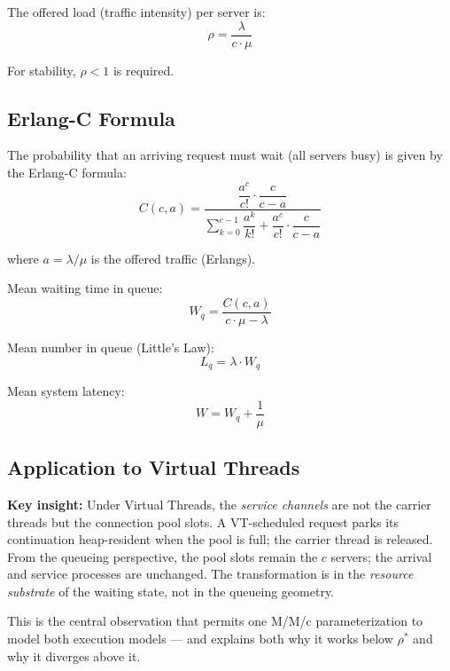 \documentclass[10pt]{article}
\begin{document}
The offered load (traffic intensity) per server is:
\begin{equation}
\rho = \frac{\lambda}{c \cdot \mu}
\label{eq:rho}
\end{equation}

For stability, $\rho < 1$ is required.

\subsection{Erlang-C Formula}
\label{sec:erlangc}

The probability that an arriving request must wait (all servers busy) is given by the Erlang-C formula:
\begin{equation}
C(c,a) = \frac{\dfrac{a^c}{c!}\cdot\dfrac{c}{c-a}}{\displaystyle\sum_{k=0}^{c-1}\dfrac{a^k}{k!} + \dfrac{a^c}{c!}\cdot\dfrac{c}{c-a}}
\label{eq:erlangc}
\end{equation}

where $a = \lambda/\mu$ is the offered traffic (Erlangs).

Mean waiting time in queue:
\begin{equation}
W_q = \frac{C(c,a)}{c\cdot\mu - \lambda}
\label{eq:wq}
\end{equation}

Mean number in queue (Little's Law):
\begin{equation}
L_q = \lambda \cdot W_q
\label{eq:lq}
\end{equation}

Mean system latency:
\begin{equation}
W = W_q + \frac{1}{\mu}
\label{eq:w}
\end{equation}

\subsection{Application to Virtual Threads}

\textbf{Key insight:} Under Virtual Threads, the \emph{service channels} are not the carrier threads but the connection pool slots. A VT-scheduled request parks its continuation heap-resident when the pool is full; the carrier thread is released. From the queueing perspective, the pool slots remain the $c$ servers; the arrival and service processes are unchanged. The transformation is in the \emph{resource substrate} of the waiting state, not in the queueing geometry.

This is the central observation that permits one M/M/c parameterization to model both execution models --- and explains both why it works below $\rho^*$ and why it diverges above it.
\end{document}
